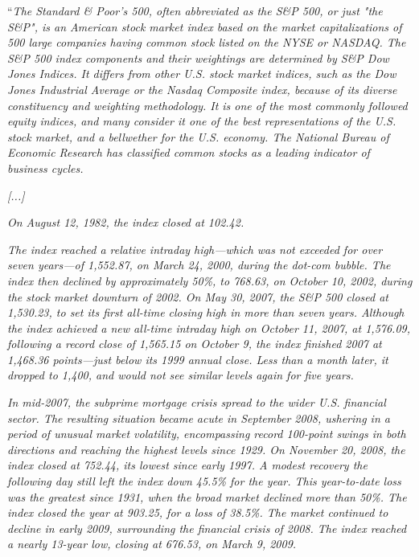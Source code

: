 ``\textit{The Standard \& Poor's 500, often abbreviated as the S\&P
  500, or just "the S\&P", is an American stock market index based on
  the market capitalizations of 500 large companies having common
  stock listed on the NYSE or NASDAQ. The S\&P 500 index components
  and their weightings are determined by S\&P Dow Jones Indices. It
  differs from other U.S. stock market indices, such as the Dow Jones
  Industrial Average or the Nasdaq Composite index, because of its
  diverse constituency and weighting methodology. It is one of the
  most commonly followed equity indices, and many consider it one of
  the best representations of the U.S. stock market, and a bellwether
  for the U.S. economy. The National Bureau of Economic Research has
  classified common stocks as a leading indicator of business cycles.}

\textit{[...]}

\textit{On August 12, 1982, the index closed at 102.42.}

\textit{The index reached a relative intraday high—which was not
  exceeded for over seven years—of 1,552.87, on March 24, 2000, during
  the dot-com bubble. The index then declined by approximately 50\%,
  to 768.63, on October 10, 2002, during the stock market downturn of
  2002. On May 30, 2007, the S\&P 500 closed at 1,530.23, to set its
  first all-time closing high in more than seven years. Although the
  index achieved a new all-time intraday high on October 11, 2007, at
  1,576.09, following a record close of 1,565.15 on October 9, the
  index finished 2007 at 1,468.36 points—just below its 1999 annual
  close. Less than a month later, it dropped to 1,400, and would not
  see similar levels again for five years.}

\textit{In mid-2007, the subprime mortgage crisis spread to the wider
  U.S. financial sector. The resulting situation became acute in
  September 2008, ushering in a period of unusual market volatility,
  encompassing record 100-point swings in both directions and reaching
  the highest levels since 1929. On November 20, 2008, the index
  closed at 752.44, its lowest since early 1997. A modest recovery the
  following day still left the index down 45.5\% for the year. This
  year-to-date loss was the greatest since 1931, when the broad market
  declined more than 50\%. The index closed the year at 903.25, for a
  loss of 38.5\%. The market continued to decline in early 2009,
  surrounding the financial crisis of 2008. The index reached a nearly
  13-year low, closing at 676.53, on March 9, 2009.}


